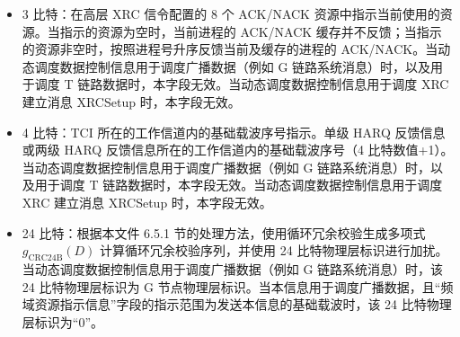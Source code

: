 \documentclass[11pt,a4paper]{ctexart}
\begin{document}
\begin{itemize}[nosep]
  \item 3 比特：在高层 XRC 信令配置的 8 个 ACK/NACK 资源中指示当前使用的资源。当指示的资源为空时，当前进程的 ACK/NACK 缓存并不反馈；当指示的资源非空时，按照进程号升序反馈当前及缓存的进程的 ACK/NACK。当动态调度数据控制信息用于调度广播数据（例如 G 链路系统消息）时，以及用于调度 T 链路数据时，本字段无效。当动态调度数据控制信息用于调度 XRC 建立消息 XRCSetup 时，本字段无效。
  \item 4 比特：TCI 所在的工作信道内的基础载波序号指示。单级 HARQ 反馈信息或两级 HARQ 反馈信息所在的工作信道内的基础载波序号（4 比特数值+1）。当动态调度数据控制信息用于调度广播数据（例如 G 链路系统消息）时，以及用于调度 T 链路数据时，本字段无效。当动态调度数据控制信息用于调度 XRC 建立消息 XRCSetup 时，本字段无效。
  \item 24 比特：根据本文件 6.5.1 节的处理方法，使用循环冗余校验生成多项式 $g_{\mathrm{CRC24B}}(D)$ 计算循环冗余校验序列，并使用 24 比特物理层标识进行加扰。当动态调度数据控制信息用于调度广播数据（例如 G 链路系统消息）时，该 24 比特物理层标识为 G 节点物理层标识。当本信息用于调度广播数据，且``频域资源指示信息''字段的指示范围为发送本信息的基础载波时，该 24 比特物理层标识为``0''。
\end{itemize}
\end{document}
